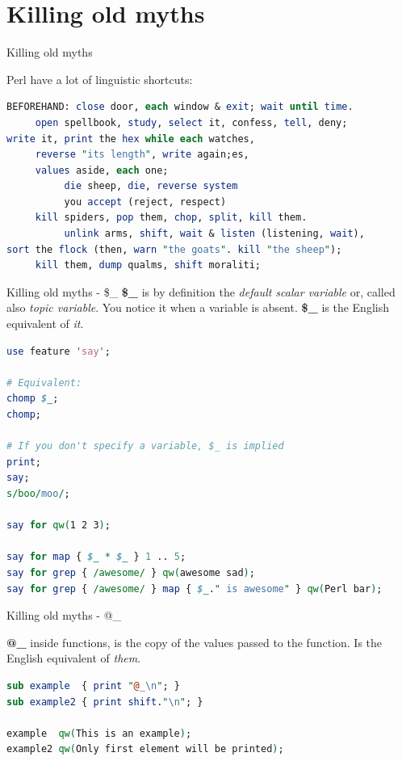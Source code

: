 \documentclass[10pt]{beamer}
\begin{document}
\section{Killing old myths}

\begin{frame}[fragile]{Killing old myths}

Perl have a lot of linguistic shortcuts:
\begin{lstlisting}[language=perl,caption={extract of an adaptation for Perl5 by ovid of ``Black Perl'' poem written by Larry Wall},captionpos=b]
BEFOREHAND: close door, each window & exit; wait until time.
     open spellbook, study, select it, confess, tell, deny;
write it, print the hex while each watches,
     reverse "its length", write again;es,
     values aside, each one;
          die sheep, die, reverse system
          you accept (reject, respect)
     kill spiders, pop them, chop, split, kill them.
          unlink arms, shift, wait & listen (listening, wait),
sort the flock (then, warn "the goats". kill "the sheep");
     kill them, dump qualms, shift moraliti;
\end{lstlisting}
\end{frame}


\begin{frame}[fragile]{Killing old myths - \$\_}
\textbf{\$\_ }is by definition the \textit{default scalar variable} or, called also \textit{topic variable}. 
You notice it when a variable is absent. \textbf{\$\_} is the English equivalent of \textit{it}.
\begin{lstlisting}[language=perl]
use feature 'say';

# Equivalent:
chomp $_;
chomp;

# If you don't specify a variable, $_ is implied
print;
say;
s/boo/moo/;

say for qw(1 2 3);

say for map { $_ * $_ } 1 .. 5;
say for grep { /awesome/ } qw(awesome sad);
say for grep { /awesome/ } map { $_." is awesome" } qw(Perl bar);
\end{lstlisting}
\end{frame}

\begin{frame}[fragile]{Killing old myths - @\_}

\textbf{@\_ } inside functions, is the copy of the values passed to the function. Is the English equivalent of \textit{them}.
\begin{lstlisting}[language=perl]
sub example  { print "@_\n"; }
sub example2 { print shift."\n"; }

example  qw(This is an example);
example2 qw(Only first element will be printed);
\end{lstlisting}

\end{frame}
\end{document}
